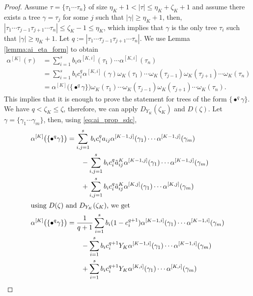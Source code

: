 \documentclass[sn-mathphys-num]{sn-jnl}%
\newcommand{\reva}[1]{#1}%
\theoremstyle{thmstyleone}%
\theoremstyle{thmstyletwo}%
\theoremstyle{thmstylethree}%
\begin{document}
\begin{proof}
    Assume $\tau = \reva{\{\tau_1 \cdots \tau_n\}}$ of size $\eta_K + 1 < |\tau| \leq \eta_K + \zeta_K + 1$ and assume there exists a tree $\gamma\reva{ = \tau_j}$ \reva{for some $j$} such that $|\gamma| \geq \eta_K + 1$, then, $\reva{|\tau_1 \cdots \tau_{j-1} \tau_{j+1} \cdots \tau_n|} \leq \zeta_K - 1 \leq \eta_K$, which implies that $\gamma$ is the only tree $\tau_i$ such that $|\gamma| \geq \eta_K + 1$.
    Let $q := |\reva{\tau_1 \cdots \tau_{j-1} \tau_{j+1} \cdots \tau_n}|$. We use Lemma \ref{lemma:ai_eta_form} to obtain
    \begin{align*}
        \alpha^{[K]} (\tau) &= \sum_{i=1}^s b_i \reva{\alpha^{[K,i]} (\tau_1) \cdots \alpha^{[K,i]} (\tau_n)} \\
                            &= \sum_{i=1}^s b_i c_i^q \alpha^{[K,i]} (\gamma) \reva{\omega_K (\tau_1) \cdots \omega_K (\tau_{j-1}) \omega_K(\tau_{j+1}) \cdots \omega_K(\tau_n)} \\
                            &= \alpha^{[K]} \big( \{\bullet^q \gamma\} \big) \reva{\omega_K (\tau_1) \cdots \omega_K (\tau_{j-1}) \omega_K(\tau_{j+1}) \cdots \omega_K(\tau_n)}.
    \end{align*}
This implies that it is enough to prove the statement for trees of the form $\{\bullet^q \gamma\}$. We have $q < \zeta_K \leq \zeta$, therefore, we can apply $D_{Y_K}(\zeta_K)$ and $D(\zeta)$. Let $\gamma = \reva{\{\gamma_1 \cdots \gamma_m\}}$, then, using \eqref{eq:ai_prop_sdc},
    \begin{align*}
        \alpha^{[K]} \big( \reva{\{\bullet^q \gamma\}} \big) &= \sum_{i,j=1}^s b_i c_i^q a_{ij} \reva{ \alpha^{[K-1,j]}(\gamma_1) \cdots \alpha^{[K-1,j]}(\gamma_m)} \\
        &\quad\quad - \sum_{i,j=1}^s b_i c_i^q \tilde{a}^{K}_{ij} \reva{\alpha^{[K-1,j]}(\gamma_1) \cdots \alpha^{[K-1,j]}(\gamma_m)} \\
        &\quad\quad + \sum_{i,j=1}^s b_i c_i^q \tilde{a}^{K}_{ij} \reva{\alpha^{[K,j]}(\gamma_1) \cdots \alpha^{[K,j]}(\gamma_m)} \\
        \shortintertext{using $D(\zeta)$ and $D_{Y_K}(\zeta_K)$, we get}
        \alpha^{[K]} \big( \reva{\{\bullet^q \gamma\}} \big) &= \frac{1}{q+1} \sum_{i=1}^s b_i (1 - c_i^{q+1}) \reva{\alpha^{[K-1,i]}(\gamma_1) \cdots \alpha^{[K-1,i]}(\gamma_m)} \\
        &\quad\quad - \sum_{i=1}^s b_i c_i^{q+1} Y_K \reva{\alpha^{[K-1,i]} (\gamma_1) \cdots \alpha^{[K-1,i]} (\gamma_m)} \\
        &\quad\quad + \sum_{i=1}^s b_i c_i^{q+1} Y_K \reva{\alpha^{[K,i]}(\gamma_1) \cdots \alpha^{[K,i]}(\gamma_m)} \\

\end{align*}
\end{proof}
\end{document}
